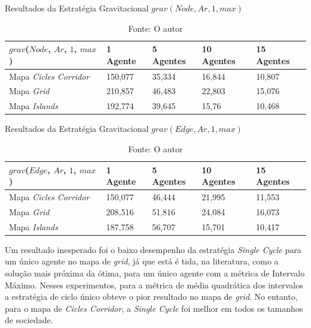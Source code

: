 \begin{table}
	\centering
	\caption{Resultados da Estratégia Gravitacional $grav(Node,Ar,1,max)$}
	\label{result_grav2}
	\begin{tabularx}{\linewidth}{|X|X|X|X|X|}
		\hline
		\textbf{$grav$($Node$, $Ar$, $1$, $max$)} & \textbf{1 Agente} & \textbf{5 Agentes} & \textbf{10 Agentes} & \textbf{15 Agentes} \\
		\hline
		Mapa \textit{Cicles Corridor} & 150,077 & 35,334 & 16,844 & 10,807 \\
		\hline
		Mapa \textit{Grid} & 210,857 & 46,483 & 22,803 & 15,076 \\
		\hline
		Mapa \textit{Islands} & 192,774 & 39,645 & 15,76 & 10,468 \\
		\hline
	\end{tabularx}
	\caption*{Fonte: O autor}
\end{table}

\begin{table}
	\centering
	\caption{Resultados da Estratégia Gravitacional $grav(Edge,Ar,1,max)$}
	\label{result_grav3}
	\begin{tabularx}{\linewidth}{|X|X|X|X|X|}
		\hline
		\textbf{$grav$($Edge$, $Ar$, $1$, $max$)} & \textbf{1 Agente} & \textbf{5 Agentes} & \textbf{10 Agentes} & \textbf{15 Agentes} \\
		\hline
		Mapa \textit{Cicles Corridor} & 150,077 & 46,444 & 21,995 & 11,553 \\
		\hline
		Mapa \textit{Grid} & 208,516 & 51,816 & 24,084 & 16,073 \\
		\hline
		Mapa \textit{Islands} & 187,758 & 56,707 & 15,701 & 10,417 \\
		\hline
	\end{tabularx}
	\caption*{Fonte: O autor}
\end{table}

Um resultado inesperado foi o baixo desempenho da estratégia \textit{Single Cycle} para um 
único agente no mapa de \textit{grid}, já que está é tida, na literatura, como 
a solução mais próxima da ótima, para um único agente com a métrica de Intervalo 
Máximo. Nesses experimentos, para a métrica de média quadrática dos intervalos a 
estratégia de ciclo único obteve o pior resultado no mapa de \textit{grid}. No 
entanto, para o mapa de \textit{Cicles Corridor}, a \textit{Single Cycle} foi 
melhor em todos os tamanhos de sociedade.

